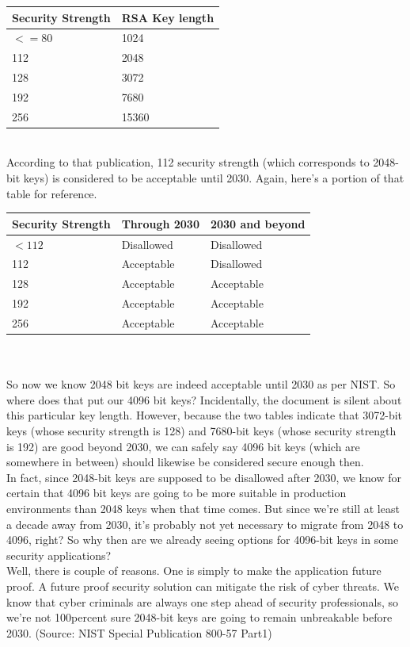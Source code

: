 \begin{tabular}{ |p{3cm}||p{3cm}|  }

	\hline
	Security Strength & RSA Key length \\
	\hline
	$<=80 $           & 1024           \\
	112               & 2048           \\
	128               & 3072           \\
	192               & 7680           \\
	256               & 15360          \\
	\hline
\end{tabular}
\\
According to that publication, 112 security strength (which corresponds to 2048-bit keys) is considered to be acceptable until 2030. Again, here's a portion of that table for reference.\\

\begin{tabular}{ |p{3cm}||p{3cm}|p{3cm}|  }

	\hline
	Security Strength & Through 2030 & 2030 and beyond \\
	\hline
	$<112 $           & Disallowed   & Disallowed      \\
	112               & Acceptable   & Disallowed      \\
	128               & Acceptable   & Acceptable      \\
	192               & Acceptable   & Acceptable      \\
	256               & Acceptable   & Acceptable      \\
	\hline
\end{tabular}
\\
\\
So now we know 2048 bit keys are indeed acceptable until 2030 as per NIST.
So where does that put our 4096 bit keys? Incidentally, the document is
silent about this particular key length. However, because the two tables
indicate that 3072-bit keys (whose security strength is 128) and 7680-bit
keys (whose security strength is 192) are good beyond 2030, we can safely
say 4096 bit keys (which are somewhere in between)
should likewise be considered secure enough then.\\
In fact, since 2048-bit keys are supposed to be disallowed after 2030, we
know for certain that 4096 bit keys are going to be more suitable in
production environments than 2048 keys when that time comes. But since
we're still at least a decade away from 2030, it's probably not yet
necessary to migrate from 2048 to 4096, right?
So why then are we already seeing options for 4096-bit keys in some security applications?\\
Well, there is  couple of reasons. One is simply to make the application
future proof. A future proof security solution can mitigate the risk of
cyber threats. We know that cyber criminals are always one step ahead of
security professionals, so we're not 100percent sure 2048-bit keys are going to
remain unbreakable before 2030. (Source: NIST Special Publication 800-57 Part1)

